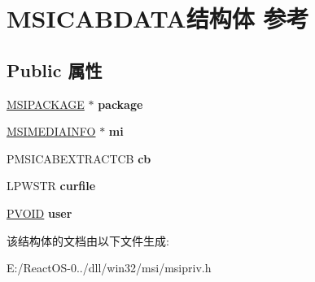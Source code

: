 \hypertarget{struct_m_s_i_c_a_b_d_a_t_a}{}\section{M\+S\+I\+C\+A\+B\+D\+A\+T\+A结构体 参考}
\label{struct_m_s_i_c_a_b_d_a_t_a}
\subsection*{Public 属性}
\begin{DoxyCompactItemize}
\item 
\mbox{\label{struct_m_s_i_c_a_b_d_a_t_a_ab8acc7cd7cc5b24dc8220dfad8a53c52}} 
\hyperlink{structtag_m_s_i_p_a_c_k_a_g_e}{M\+S\+I\+P\+A\+C\+K\+A\+GE} $\ast$ {\bfseries package}
\item 
\mbox{\label{struct_m_s_i_c_a_b_d_a_t_a_ae7747bf6e8953346c9ae0b8ad2453456}} 
\hyperlink{structtag_m_s_i_m_e_d_i_a_i_n_f_o}{M\+S\+I\+M\+E\+D\+I\+A\+I\+N\+FO} $\ast$ {\bfseries mi}
\item 
\mbox{\label{struct_m_s_i_c_a_b_d_a_t_a_ae31b061f865722de68ae1f47ea77bf85}} 
P\+M\+S\+I\+C\+A\+B\+E\+X\+T\+R\+A\+C\+T\+CB {\bfseries cb}
\item 
\mbox{\label{struct_m_s_i_c_a_b_d_a_t_a_a278c9895f664ea42bcf167084f3fd5a5}} 
L\+P\+W\+S\+TR {\bfseries curfile}
\item 
\mbox{\label{struct_m_s_i_c_a_b_d_a_t_a_a1496d37a8884d6a179cc134bbdae8303}} 
\hyperlink{interfacevoid}{P\+V\+O\+ID} {\bfseries user}
\end{DoxyCompactItemize}


该结构体的文档由以下文件生成\+:\begin{DoxyCompactItemize}
\item 
E\+:/\+React\+O\+S-\/0../dll/win32/msi/msipriv.\+h\end{DoxyCompactItemize}
